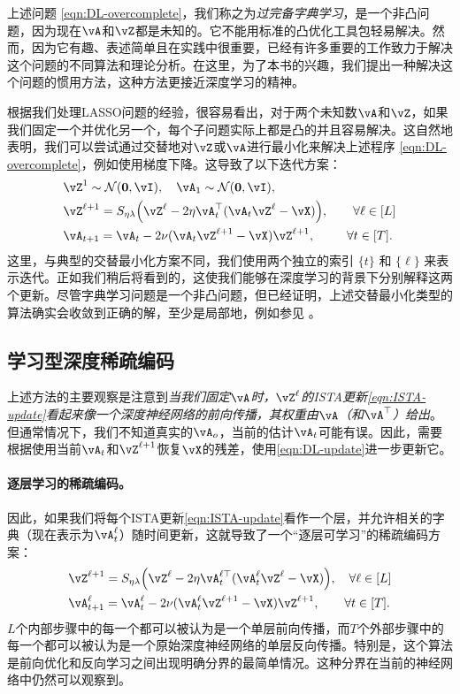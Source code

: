 \documentclass[../../book-main.tex]{subfiles}
\begin{document}
上述问题 \eqref{eqn:DL-overcomplete}，我们称之为\textit{过完备字典学习}，是一个非凸问题，因为现在\(\vA\)和\(\vZ\)都是未知的。它不能用标准的凸优化工具包轻易解决。然而，因为它有趣、表述简单且在实践中很重要，已经有许多重要的工作致力于解决这个问题的不同算法和理论分析。在这里，为了本书的兴趣，我们提出一种解决这个问题的惯用方法，这种方法更接近深度学习的精神。

根据我们处理LASSO问题的经验，很容易看出，对于两个未知数\(\vA\)和\(\vZ\)，如果我们固定一个并优化另一个，每个子问题实际上都是凸的并且容易解决。这自然地表明，我们可以尝试通过交替地对\(\vZ\)或\(\vA\)进行最小化来解决上述程序 \eqref{eqn:DL-overcomplete}，例如使用梯度下降。这导致了以下迭代方案：
\begin{align}
    & \vZ^{1}
     \sim \dNorm(\vzero, \vI), \quad \vA_{1}
     \sim \dNorm(\vzero, \vI), \\ 
    &\vZ^{\ell + 1} = S_{\eta\lambda}\rp{\vZ^{\ell} - 2\eta\vA_{t}^{\top}(\vA_{t}\vZ^{\ell} - \vX)}, \qquad \forall \ell \in [L] \label{eqn:ISTA-update}\\ 
    &\vA_{t + 1} = \vA_{t} - 2\nu (\vA_{t}\vZ^{\ell + 1} - \vX)\vZ^{\ell + 1}, \qquad\;\; \forall t \in [T].\label{eqn:DL-update}
\end{align}
这里，与典型的交替最小化方案不同，我们使用两个独立的索引 $\{t\}$ 和 $\{\ell\}$ 来表示迭代。正如我们稍后将看到的，这使我们能够在深度学习的背景下分别解释这两个更新。尽管字典学习问题是一个非凸问题，但已经证明，上述交替最小化类型的算法确实会收敛到正确的解，至少是局部地，例如参见 \cite{alekh-2016}。


\subsection{学习型深度稀疏编码}
\label{sec:LISTA}
上述方法的主要观察是注意到\textit{当我们固定\(\vA\)时，$\vZ^\ell$的ISTA更新\eqref{eqn:ISTA-update}看起来像一个深度神经网络的前向传播，其权重由\(\vA\)（和\(\vA^{\top}\)）给出}。但通常情况下，我们不知道真实的$\vA_o$，当前的估计$\vA_t$可能有误。因此，需要根据使用当前$\vA_t$和$\vZ^{\ell +1}$恢复$\vX$的残差，使用\eqref{eqn:DL-update}进一步更新它。


\paragraph{逐层学习的稀疏编码。}
因此，如果我们将每个ISTA更新\eqref{eqn:ISTA-update}看作一个层，并允许相关的字典（现在表示为$\vA_t^\ell$）随时间更新，这就导致了一个“逐层可学习”的稀疏编码方案：
\begin{align}
    & \vZ^{\ell + 1} = S_{\eta\lambda}\rp{\vZ^{\ell} - 2\eta\vA_{t}^{\ell\top}(\vA_{t}^\ell\vZ^{\ell} - \vX)}, \quad \forall \ell \in [L] \\ 
    & \vA_{t + 1}^\ell = \vA_{t}^\ell - 2\nu (\vA_{t}^\ell\vZ^{\ell + 1} - \vX)\vZ^{\ell + 1}, \qquad \forall t \in [T].
\end{align}
\(L\)个内部步骤中的每一个都可以被认为是一个单层前向传播，而\(T\)个外部步骤中的每一个都可以被认为是一个原始深度神经网络的单层反向传播。特别是，这个算法是前向优化和反向学习之间出现明确分界的最简单情况。这种分界在当前的神经网络中仍然可以观察到。
\end{document}
